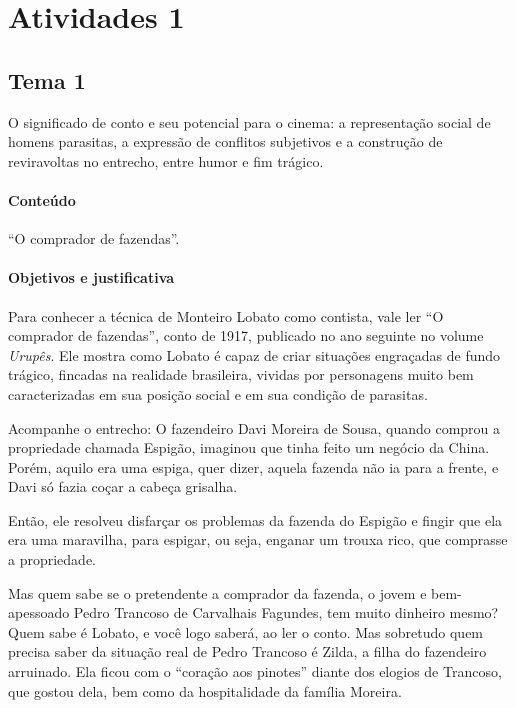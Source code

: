 \documentclass[11pt]{extarticle}
\begin{document}
\tableofcontents


\section{Atividades 1}

\subsection{Tema 1}

O significado de conto e seu potencial para o cinema: a representação
social de homens parasitas, a expressão de conflitos subjetivos e a
construção de reviravoltas no entrecho, entre humor e fim trágico.


\paragraph{Conteúdo} ``O comprador de fazendas''.

\paragraph{Objetivos e justificativa}
Para conhecer a técnica de Monteiro Lobato como contista, vale ler ``O
comprador de fazendas'', conto de 1917, publicado no ano seguinte no
volume \emph{Urupês}. Ele mostra como Lobato é capaz de criar situações
engraçadas de fundo trágico, fincadas na realidade brasileira, vividas
por personagens muito bem caracterizadas em sua posição social e em sua
condição de parasitas.

Acompanhe o entrecho: O fazendeiro Davi Moreira de Sousa, quando comprou
a propriedade chamada Espigão, imaginou que tinha feito um negócio da
China. Porém, aquilo era uma espiga, quer dizer, aquela fazenda não ia
para a frente, e Davi só fazia coçar a cabeça grisalha.

Então, ele resolveu disfarçar os problemas da fazenda do Espigão e
fingir que ela era uma maravilha, para espigar, ou seja, enganar um
trouxa rico, que comprasse a propriedade.

Mas quem sabe se o pretendente a comprador da fazenda, o jovem e
bem-apessoado Pedro Trancoso de Carvalhais Fagundes, tem muito dinheiro
mesmo? Quem sabe é Lobato, e você logo saberá, ao ler o conto. Mas
sobretudo quem precisa saber da situação real de Pedro Trancoso é Zilda,
a filha do fazendeiro arruinado. Ela ficou com o ``coração aos pinotes''
diante dos elogios de Trancoso, que gostou dela, bem como da
hospitalidade da família Moreira.
\end{document}
